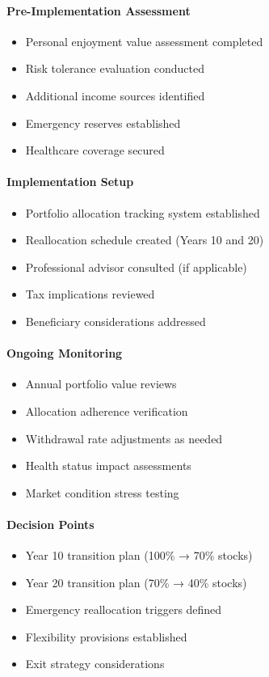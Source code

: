 \documentclass[11pt,letterpaper]{article}
\begin{document}
\paragraph{Pre-Implementation Assessment}
\begin{itemize}
\item [ ] Personal enjoyment value assessment completed
\item [ ] Risk tolerance evaluation conducted
\item [ ] Additional income sources identified
\item [ ] Emergency reserves established
\item [ ] Healthcare coverage secured
\end{itemize}

\paragraph{Implementation Setup}
\begin{itemize}
\item [ ] Portfolio allocation tracking system established
\item [ ] Reallocation schedule created (Years 10 and 20)
\item [ ] Professional advisor consulted (if applicable)
\item [ ] Tax implications reviewed
\item [ ] Beneficiary considerations addressed
\end{itemize}

\paragraph{Ongoing Monitoring}
\begin{itemize}
\item [ ] Annual portfolio value reviews
\item [ ] Allocation adherence verification
\item [ ] Withdrawal rate adjustments as needed
\item [ ] Health status impact assessments
\item [ ] Market condition stress testing
\end{itemize}

\paragraph{Decision Points}
\begin{itemize}
\item [ ] Year 10 transition plan (100\% → 70\% stocks)
\item [ ] Year 20 transition plan (70\% → 40\% stocks)
\item [ ] Emergency reallocation triggers defined
\item [ ] Flexibility provisions established
\item [ ] Exit strategy considerations
\end{itemize}
\end{document}
